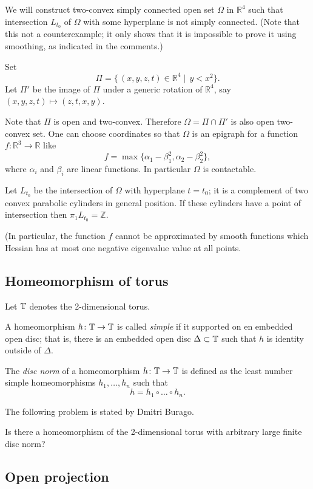  We will construct two-convex simply connected open set $\Omega$ in $\mathbb R^4$ such that intersection $L_{t_0}$ of $\Omega$ with some hyperplane is not simply connected.
(Note that this not a counterexample;
it only shows that it is impossible to prove it using smoothing, as indicated in the comments.)

Set 
$$\Pi=\{\,(x,y,z,t)\in\mathbb R^4\mid\,y< x^2\}.$$
Let $\Pi'$ be the image of $\Pi$ under a generic rotation of $\mathbb R^4$,
say $(x,y,z,t)\mapsto(z,t,x,y)$.

Note that $\Pi$ is open and two-convex.
Therefore $\Omega=\Pi\cap \Pi'$ is also open two-convex set.
One can choose coordinates so that $\Omega$ is an epigraph for a function $f\colon\mathbb R^3\to\mathbb R$ like
$$f=\max\{\alpha_1-\beta_1^2,\alpha_2-\beta_2^2 \},$$
where $\alpha_i$ and $\beta_i$ are linear functions.
In particular $\Omega$ is contactable.

Let $L_{t_0}$ be the intersection of $\Omega$ with hyperplane $t=t_0$;
it is a complement of two convex parabolic cylinders in general position. 
If these cylinders have a point of intersection then $\pi_1 L_{t_0}=\mathbb Z$.
 
(In particular, the function $f$ cannot be approximated by smooth functions which Hessian has at most one negative eigenvalue value at all points.
 
\subsection*{Homeomorphism of torus}

Let $\mathbb{T}$ denotes the 2-dimensional torus.

A homeomorphism $h\colon\mathbb{T}\to \mathbb{T}$ is called \emph{simple} if it supported on en embedded open disc;
that is, there is an embedded open disc $\Delta\subset \mathbb{T}$ such that $h$ is identity outside of $\Delta$.

The \emph{disc norm} of a homeomorphism $h\colon\mathbb{T}\to \mathbb{T}$ is defined as the least number simple homeomorphisms $h_1,\dots,h_n$ such that
\[h=h_1\circ\dots\circ h_n.\]

The following problem is stated by Dmitri Burago.

\begin{pr}
Is there a homeomorphism of the 2-dimensional torus with arbitrary large finite disc norm?
\end{pr}



\subsection*{Open projection}

